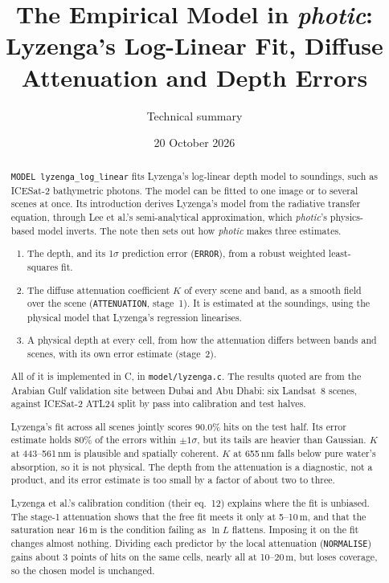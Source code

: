\documentclass[11pt]{article}
\title{The Empirical Model in \textit{photic}:\\
Lyzenga's Log-Linear Fit, Diffuse Attenuation and Depth Errors}
\author{Technical summary}
\date{20 October 2026}
\numberwithin{equation}{section}
\newcommand{\code}[1]{\texttt{#1}}
\begin{document}
\maketitle

\begin{abstract}
\code{MODEL lyzenga\_log\_linear} fits Lyzenga's log-linear depth model to soundings, such as
ICESat-2 bathymetric photons. The model can be fitted to one image or to several scenes at once.
Its introduction derives Lyzenga's model from the radiative transfer equation, through Lee et
al.'s semi-analytical approximation, which \textit{photic}'s physics-based model inverts. The
note then sets out how \textit{photic} makes three estimates.
\begin{enumerate}
\item The depth, and its 1$\sigma$ prediction error (\code{ERROR}), from a robust weighted
  least-squares fit.
\item The diffuse attenuation coefficient $K$ of every scene and band, as a smooth field over the
  scene (\code{ATTENUATION}, stage~1). It is estimated at the soundings, using the physical model
  that Lyzenga's regression linearises.
\item A physical depth at every cell, from how the attenuation differs between bands and scenes,
  with its own error estimate (stage~2).
\end{enumerate}
All of it is implemented in C, in \code{model/lyzenga.c}. The results quoted are from the
Arabian Gulf validation site between Dubai and Abu Dhabi: six Landsat~8 scenes, against
ICESat-2 ATL24 split by pass into calibration and test halves.

Lyzenga's fit across all scenes jointly scores 90.0\% hits on the test half. Its error estimate
holds 80\% of the errors within $\pm1\sigma$, but its tails are heavier than Gaussian. $K$ at
443--561\,nm is plausible and spatially coherent. $K$ at 655\,nm falls below pure water's
absorption, so it is not physical. The depth from the attenuation is a diagnostic, not a
product, and its error estimate is too small by a factor of about two to three.

Lyzenga et al.'s calibration condition (their eq.~12) explains where the fit is unbiased. The
stage-1 attenuation shows that the free fit meets it only at 5--10\,m, and that the saturation
near 16\,m is the condition failing as $\ln L$ flattens. Imposing it on the fit changes almost
nothing. Dividing each predictor by the local attenuation (\code{NORMALISE}) gains about
3 points of hits on the same cells, nearly all at 10--20\,m, but loses coverage, so the chosen
model is unchanged.


\end{abstract}
\end{document}
